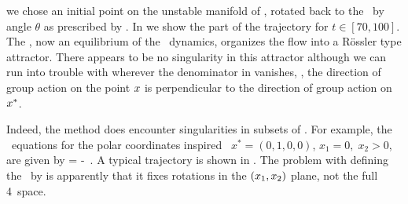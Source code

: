 we chose an initial point on the unstable manifold
of , rotated back to the \slice\ by angle $\theta$ as
prescribed by . In  we
show the part of the trajectory for $t\in\left[70,100\right]$.
The \reqv, now an equilibrium of the
\reducedsp\ dynamics, organizes the flow into a R\"ossler type
attractor. There appears to be no singularity in this
attractor although we can run into trouble with
 wherever the denominator in
 vanishes, \ie, the direction of group
action on the point $x$ is perpendicular to the direction
of group action on $x^*$.


Indeed, the method does encounter singularities in
subsets of \statesp.
For example, the \reducedsp\ equations 
for the polar coordinates inspired \slice\
$x^{*}=(0,1,0,0)$, $x_1=0,\;x_2>0$,
are given by
\beq
\dot{\ssp} = \vel -  \Lg \cdot \ssp
\,.
A typical trajectory is shown in .
The problem with defining the \slice\ by
 is apparently that it fixes rotations
in the $(x_1,x_2)$ plane, not the full 4\dmn\ space.

